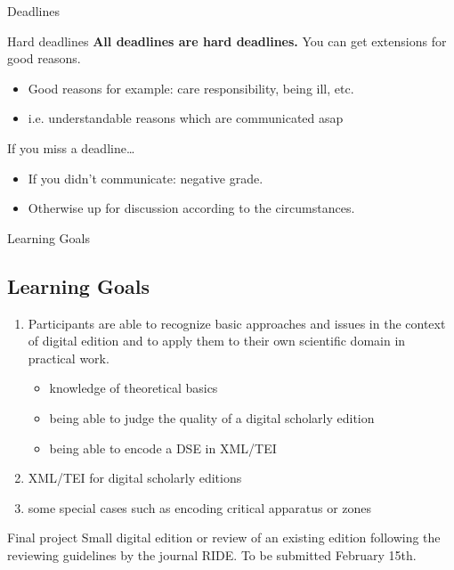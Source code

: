 \begin{frame}{Deadlines}

\begin{alertblock}{Hard deadlines}\small
\textbf{All deadlines are hard deadlines.}  You can get extensions for good reasons. 
\begin{itemize}
\item Good reasons for example: care responsibility, being ill, etc.
\item i.e. understandable reasons which are communicated asap
\end{itemize}

\end{alertblock}

\begin{alertblock}{If you miss a deadline\dots}
\begin{itemize}\small
\item If you didn’t communicate: negative grade.
\item Otherwise up for discussion according to the circumstances.
\end{itemize}
\end{alertblock}

\end{frame}
\begin{frame}{Learning Goals}
\subsection{Learning Goals}
\begin{enumerate}
    \item Participants are able to recognize basic approaches and issues in the context of digital edition and to apply them to their own scientific domain in practical work.
    \begin{itemize}
        \item knowledge of theoretical basics
        \item being able to judge the quality of a digital scholarly edition
        \item being able to encode a DSE in XML/TEI
    \end{itemize}
    \item XML/TEI for digital scholarly editions
    \item some special cases such as encoding critical apparatus or zones
\end{enumerate}

\begin{alertblock}{Final project}
\footnotesize
Small digital edition or review of an existing edition following the reviewing guidelines by the journal RIDE. To be submitted February 15th.

\end{alertblock}
\end{frame}


